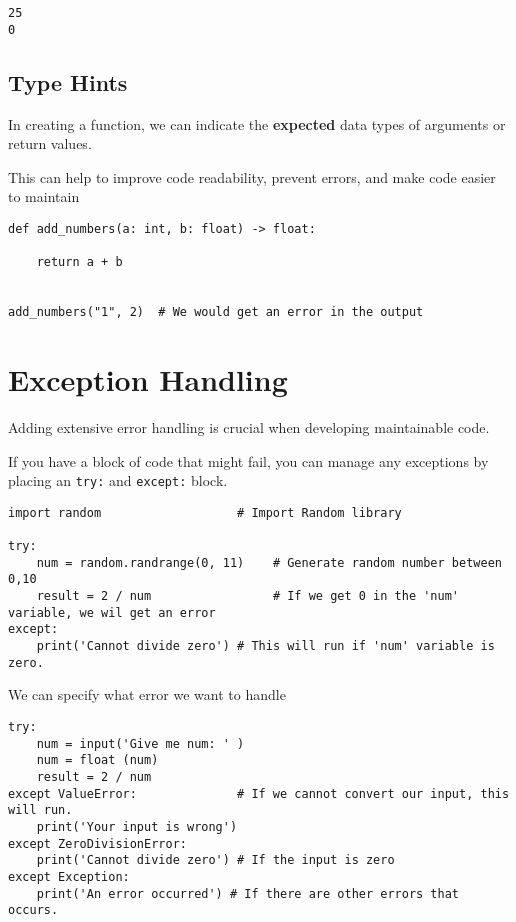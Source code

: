 \documentclass[11pt]{article}
\begin{document}
\begin{verbatim}
25
0
\end{verbatim}



\subsection{Type Hints}
\label{sec:org5ef7b40}
In creating a function, we can indicate the \textbf{expected} data types of arguments or return values.

This can help to improve code readability, prevent errors, and make code easier to maintain

\begin{verbatim}
def add_numbers(a: int, b: float) -> float:

    return a + b


add_numbers("1", 2)  # We would get an error in the output
\end{verbatim}







\section{Exception Handling}
\label{sec:orge849171}
Adding extensive error handling is crucial when developing maintainable code.

If you have a block of code that might fail, you can
manage any exceptions by placing an \texttt{try:} and \texttt{except:} block.
\begin{verbatim}
import random                   # Import Random library

try:
    num = random.randrange(0, 11)    # Generate random number between 0,10
    result = 2 / num                 # If we get 0 in the 'num' variable, we wil get an error 
except:
    print('Cannot divide zero') # This will run if 'num' variable is zero.
\end{verbatim}

We can specify what error we want to handle


\begin{verbatim}
try:
    num = input('Give me num: ' )               
    num = float (num)
    result = 2 / num
except ValueError:              # If we cannot convert our input, this will run.
    print('Your input is wrong')
except ZeroDivisionError:
    print('Cannot divide zero') # If the input is zero
except Exception:
    print('An error occurred') # If there are other errors that occurs.

\end{verbatim}
\end{document}
